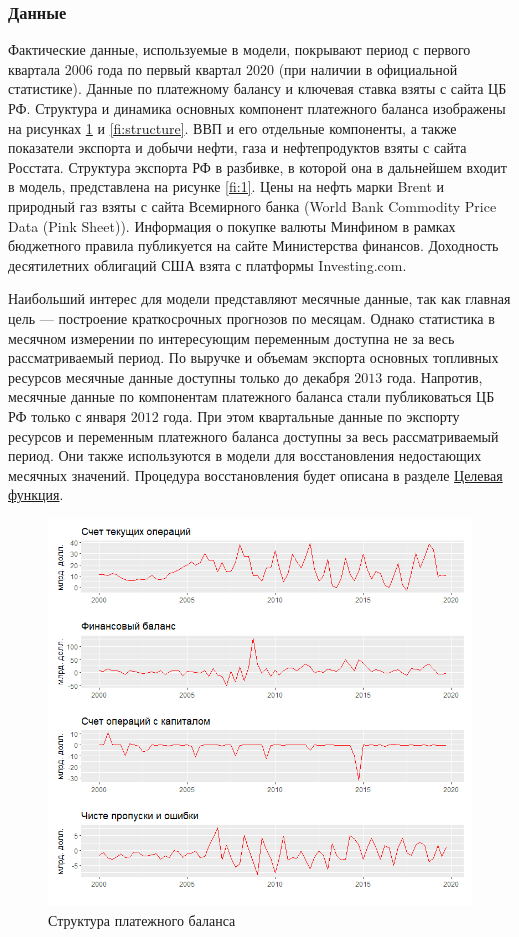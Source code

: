 \documentclass[a4paper, 14pt]{extarticle}
\begin{document}
\subsubsection{Данные}\label{sub:data}
Фактические данные, используемые в модели, покрывают период с первого квартала $2006$ года по первый квартал $2020$ (при наличии в официальной статистике).
Данные по платежному балансу и ключевая ставка взяты с сайта ЦБ РФ. 
Структура и динамика основных компонент платежного баланса изображены на рисунках  \ref{fi:structure_other} и \ref{fi:structure}.
ВВП и его отдельные компоненты, а также показатели экспорта и добычи нефти, газа и нефтепродуктов взяты с сайта Росстата.
Структура экспорта РФ в разбивке, в которой она в дальнейшем входит в модель, представлена на рисунке \ref{fi:1}.
Цены на нефть марки Brent и природный газ взяты с сайта Всемирного банка (World Bank Commodity Price Data (Pink Sheet)).
Информация о покупке валюты Минфином в рамках бюджетного правила публикуется на сайте Министерства финансов.
Доходность десятилетних облигаций США взята с платформы Investing.com.

Наибольший интерес для модели представляют месячные данные, так как главная цель — построение краткосрочных прогнозов по месяцам. 
Однако статистика в месячном измерении по интересующим переменным доступна не за весь рассматриваемый период.
По выручке и объемам экспорта основных топливных ресурсов месячные данные доступны только до декабря $2013$ года. 
Напротив, месячные данные по компонентам платежного баланса стали публиковаться ЦБ РФ только с января $2012$ года.
При этом квартальные данные по экспорту ресурсов и переменным платежного баланса доступны за весь рассматриваемый период.
Они также используются в модели для восстановления недостающих месячных значений.
Процедура восстановления будет описана в разделе \hyperref[sub:costfunction]{Целевая функция}.


\begin{figure}[htp!]
	\centering
	\includegraphics[width=\linewidth]{bal_str.png}
	\captionsetup{justification=centering,margin=0.5cm}
	\caption{Структура платежного баланса}\label{fi:structure_other}
\end{figure}
\end{document}
